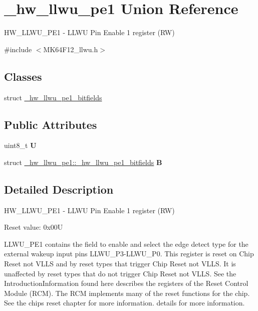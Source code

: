 \hypertarget{union__hw__llwu__pe1}{}\section{\+\_\+hw\+\_\+llwu\+\_\+pe1 Union Reference}
\label{union__hw__llwu__pe1}


H\+W\+\_\+\+L\+L\+W\+U\+\_\+\+P\+E1 -\/ L\+L\+WU Pin Enable 1 register (RW)  




{\ttfamily \#include $<$M\+K64\+F12\+\_\+llwu.\+h$>$}

\subsection*{Classes}
\begin{DoxyCompactItemize}
\item 
struct \hyperlink{struct__hw__llwu__pe1_1_1__hw__llwu__pe1__bitfields}{\+\_\+hw\+\_\+llwu\+\_\+pe1\+\_\+bitfields}
\end{DoxyCompactItemize}
\subsection*{Public Attributes}
\begin{DoxyCompactItemize}
\item 
uint8\+\_\+t {\bfseries U}\hypertarget{union__hw__llwu__pe1_a4f1d87730ce4c6914955886fa5ef2070}{}\label{union__hw__llwu__pe1_a4f1d87730ce4c6914955886fa5ef2070}

\item 
struct \hyperlink{struct__hw__llwu__pe1_1_1__hw__llwu__pe1__bitfields}{\+\_\+hw\+\_\+llwu\+\_\+pe1\+::\+\_\+hw\+\_\+llwu\+\_\+pe1\+\_\+bitfields} {\bfseries B}\hypertarget{union__hw__llwu__pe1_a48660a18ec51b267dc074c5ede7ca090}{}\label{union__hw__llwu__pe1_a48660a18ec51b267dc074c5ede7ca090}

\end{DoxyCompactItemize}


\subsection{Detailed Description}
H\+W\+\_\+\+L\+L\+W\+U\+\_\+\+P\+E1 -\/ L\+L\+WU Pin Enable 1 register (RW) 

Reset value\+: 0x00U

L\+L\+W\+U\+\_\+\+P\+E1 contains the field to enable and select the edge detect type for the external wakeup input pins L\+L\+W\+U\+\_\+\+P3-\/\+L\+L\+W\+U\+\_\+\+P0. This register is reset on Chip Reset not V\+L\+LS and by reset types that trigger Chip Reset not V\+L\+LS. It is unaffected by reset types that do not trigger Chip Reset not V\+L\+LS. See the Introduction\+Information found here describes the registers of the Reset Control Module (R\+CM). The R\+CM implements many of the reset functions for the chip. See the chip\textquotesingle{}s reset chapter for more information. details for more information. 

